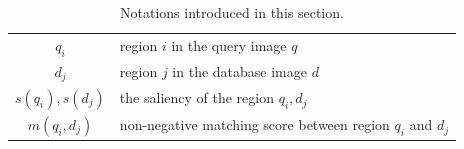 \begin{table}[htbp]
\begin{center}
\begin{tabular}{|c|p{}|}
\hline
$q_i$ & region $i$ in the query image $q$\\[0.2cm]
$d_j$ & region $j$ in the database image $d$\\[0.2cm]
$s(q_i), s(d_j)$ & the saliency of the region $q_i, d_j$ \\[0.2cm]
$m(q_i, d_j)$ & non-negative matching score between region $q_i$ and $d_j$ \\[0.2cm]
\hline
\end{tabular}
\end{center}
\caption{Notations introduced in this section.}
\label{table:notations}
\end{table}
